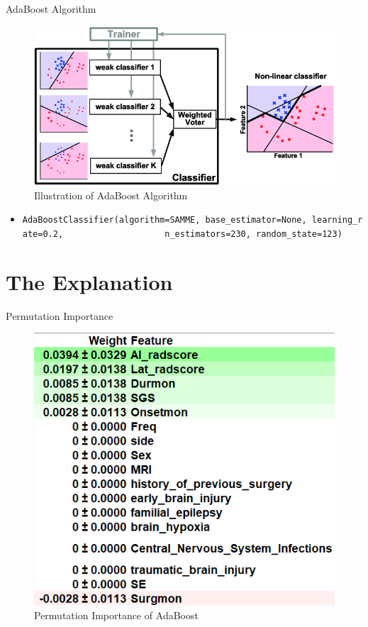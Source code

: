 \documentclass[
  11pt,
  ignorenonframetext,
  fontset=fandol]{beamer}
\providecommand{\tightlist}{%
  \setlength{\itemsep}{0pt}\setlength{\parskip}{0pt}}
\begin{document}
\begin{frame}[fragile]{AdaBoost Algorithm}
\protect\hypertarget{adaboost-algorithm}{}
\begin{figure}

{\centering \includegraphics[width=0.8\linewidth]{images/AdaBoost} 

}

\caption{Illustration of AdaBoost Algorithm}\label{fig:unnamed-chunk-7}
\end{figure}

\begin{itemize}
\tightlist
\item
  \texttt{AdaBoostClassifier(algorithm=\textquotesingle{}SAMME\textquotesingle{},\ base\_estimator=None,\ learning\_rate=0.2,\ \ \ \ \ \ \ \ \ \ \ \ \ \ \ \ \ \ \ \ n\_estimators=230,\ random\_state=123)}
\end{itemize}
\end{frame}

\hypertarget{the-explanation}{%
\section{The Explanation}\label{the-explanation}}

\begin{frame}{Permutation Importance}
\protect\hypertarget{permutation-importance}{}
\begin{figure}

{\centering \includegraphics[width=0.6\linewidth]{images/eli5} 

}

\caption{Permutation Importance of AdaBoost}\label{fig:unnamed-chunk-8}
\end{figure}
\end{frame}
\end{document}
